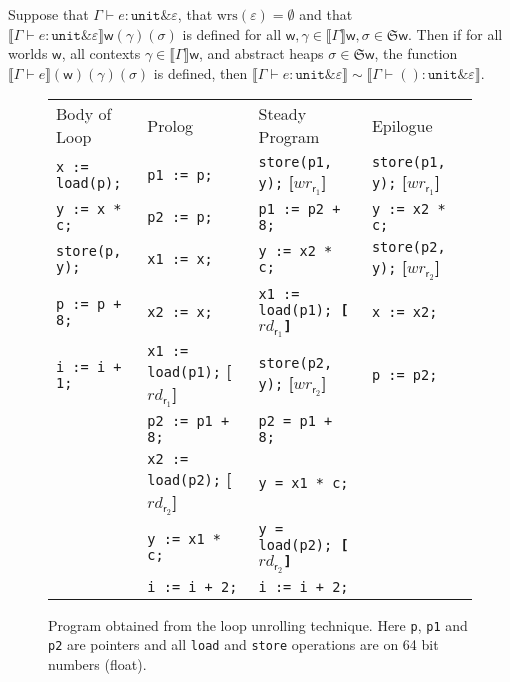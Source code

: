 \documentclass[orivec]{llncs}
\newif\iffull\fullfalse
\newcommand{\keywd}[1]{\mathtt{#1}}
\newcommand{\unittype}{\keywd{unit}}
\newcommand{\unitval}{\keywd{()}}
\newcommand{\wrsin}[1]{\mathrm{wrs}({#1})}
\newcommand{\eff}{\varepsilon}
\newcommand{\regid}{\ensuremath{\mathsf{r}}}
\newcommand{\sem}[1]{\ensuremath{\llbracket {#1} \rrbracket}}
\newcommand{\rEff}[1]{\ensuremath{\mathit{rd}_{#1}}}
\newcommand{\wEff}[1]{\ensuremath{\mathit{wr}_{#1}}}
\newcommand\w{\ensuremath{\mathsf{w}}\xspace}
\newcommand{\Astores}{\mathfrak{S}}
\newcommand{\ety}[2]{{#1}\mathrel{\&}{#2}}
\begin{document}
 \begin{proposition}\label{dead}
Suppose that
$\Gamma \vdash e : \ety{\unittype}{\eff}$,
that $\wrsin{\eff}=\emptyset$ and that $\sem{\Gamma\vdash
e: \ety{\unittype}{\eff}}\w(\gamma)(\sigma)$ is defined for all
$\w,\gamma\in\sem{\Gamma}\w, \sigma\in\Astores\w$. 
Then if for all worlds \w, all contexts $\gamma \in
\sem{\Gamma}\w$, and abstract heaps $\sigma \in \Astores\w$,
the function $\sem{\Gamma \vdash e}(\w)(\gamma)(\sigma)$ is defined, 
then $\sem{\Gamma \vdash e : \ety{\unittype}{\eff}} \sim \sem{\Gamma
\vdash \unitval : \ety{\unittype}{\eff}}$.
\end{proposition}
 \fi
\iffull
\begin{figure*}[t]
\begin{center}
\begin{small}
\begin{tabular}{l@{\quad}l@{\quad}l@{\quad}l}
Body of Loop & Prolog & Steady Program & Epilogue\\
\texttt{x := load(p);} & \texttt{p1 := p;} &
\texttt{store(p1, y);}
\textbf{[$\wEff{\regid_1}$]} & \texttt{store(p1, y);}
\textbf{[$\wEff{\regid_1}$]}\\ 

\texttt{y := x * c;} & \texttt{p2 := p;} & \texttt{p1 := p2 + 8;} &
\texttt{y := x2 * c;} \\

\texttt{store(p, y);} & \texttt{x1 := x;} & \texttt{y := x2 * c;}
& \texttt{store(p2, y);} \textbf{[$\wEff{\regid_2}$]}\\

\texttt{p := p + 8;} & \texttt{x2 := x;} & \texttt{x1 := load(p1);
\textbf{[$\rEff{\regid_1}$]}} & \texttt{x := x2;}\\

\texttt{i := i + 1;} & \texttt{x1 := load(p1);}
\textbf{[$\rEff{\regid_1}$]} &
\texttt{store(p2, y);} \textbf{[$\wEff{\regid_2}$]}
& \texttt{p := p2;}\\

& \texttt{p2 := p1 + 8;} & \texttt{p2 = p1 + 8;}\\
& \texttt{x2 := load(p2);} \textbf{[$\rEff{\regid_2}$]} &
\texttt{y
= x1 * c;}\\

& \texttt{y := x1 * c;} & \texttt{y = load(p2);
\textbf{[$\rEff{\regid_2}$]}}\\

& \texttt{i := i + 2;} & \texttt{i := i + 2;}\\
\end{tabular}
\end{small}
\vspace{-2mm}
\end{center}
\caption{Program obtained from the loop unrolling technique. Here
\texttt{p}, \texttt{p1} and \texttt{p2} are pointers and all \texttt{load}
and \texttt{store} operations are on 64 bit numbers (float).}
\label{fig:loop-unrolling}
\vspace{-4mm}
\end{figure*}
\end{document}

